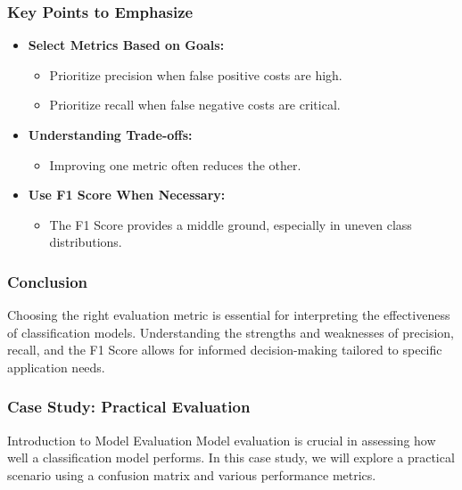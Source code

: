 \documentclass[aspectratio=169]{beamer}
\begin{document}
\begin{frame}[fragile]
    \frametitle{Key Points to Emphasize}
    \begin{itemize}
        \item \textbf{Select Metrics Based on Goals:} 
            \begin{itemize}
                \item Prioritize precision when false positive costs are high.
                \item Prioritize recall when false negative costs are critical.
            \end{itemize}
        \item \textbf{Understanding Trade-offs:} 
            \begin{itemize}
                \item Improving one metric often reduces the other.
            \end{itemize}
        \item \textbf{Use F1 Score When Necessary:} 
            \begin{itemize}
                \item The F1 Score provides a middle ground, especially in uneven class distributions.
            \end{itemize}
    \end{itemize}
\end{frame}

\begin{frame}[fragile]
    \frametitle{Conclusion}
    Choosing the right evaluation metric is essential for interpreting the effectiveness of classification models.
    Understanding the strengths and weaknesses of precision, recall, and the F1 Score allows for informed decision-making tailored to specific application needs.
\end{frame}

\begin{frame}[fragile]
    \frametitle{Case Study: Practical Evaluation}
    \begin{block}{Introduction to Model Evaluation}
        Model evaluation is crucial in assessing how well a classification model performs. In this case study, we will explore a practical scenario using a confusion matrix and various performance metrics.
    \end{block}
\end{frame}
\end{document}
